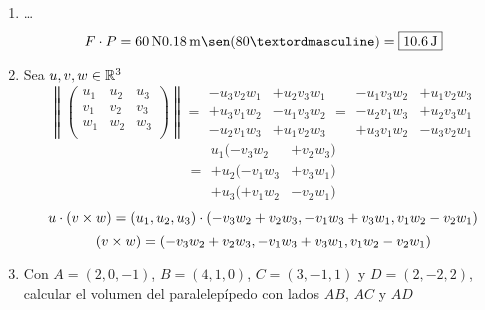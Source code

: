\documentclass[../practica.root.tex]{subfiles}
\begin{document}
\begin{enumerate}
    \item \dots
          \[F \cdot P = \SI{60}{\newton}\SI{0,18}{\m}\sen(80º) = \boxed{\SI{10,6}{\joule}} \]

    \item Sea $u,v,w \in \mathbb{R}^3$
          \[
              \left\|
              \begin{pmatrix}
                  u_1 & u_2 & u_3 \\
                  v_1 & v_2 & v_3 \\
                  w_1 & w_2 & w_3 \\
              \end{pmatrix}
              \right\|
              =
              \begin{array}{rl}
                  -u_3 v_2 w_1  & + u_2 v_3 w_1 \\
                  + u_3 v_1 w_2 & - u_1 v_3 w_2 \\
                  - u_2 v_1 w_3 & + u_1 v_2 w_3
              \end{array}
              =
              \begin{array}{rl}
                  - u_1 v_3 w_2 & + u_1 v_2 w_3 \\
                  - u_2 v_1 w_3 & + u_2 v_3 w_1 \\
                  + u_3 v_1 w_2 & -u_3 v_2 w_1
              \end{array}
          \] \[
              =
              \begin{array}{rl}
                  u_1(- v_3 w_2   & + v_2 w_3) \\
                  + u_2(- v_1 w_3 & + v_3 w_1) \\
                  + u_3(+ v_1 w_2 & -v_2 w_1)
              \end{array}
          \] \[
              u \cdot (v \times w) = (u_1, u_2, u_3) \cdot (-v_3w_2+v_2w_3, -v_1w_3+v_3w_1, v_1w_2-v_2w_1)
          \] \[
              (v \times w) = (-v_3w_2+v_2w_3, -v_1w_3+v_3w_1, v_1w_2-v_2w_1)
          \]

    \item Con $A = (2, 0, -1)$, $B = (4, 1, 0)$, $C = (3, -1, 1)$ y $D = (2, -2, 2)$,
          calcular el volumen del paralelepípedo con lados $AB$, $AC$ y $AD$


\end{enumerate}
\end{document}
